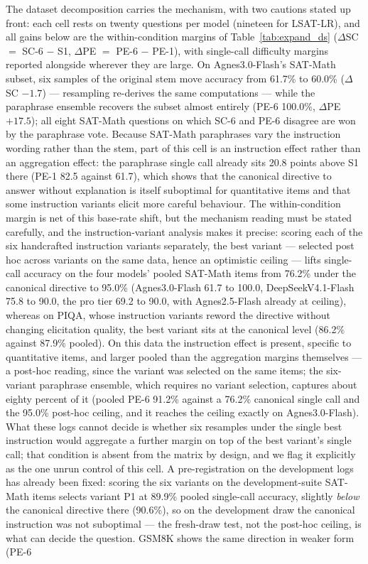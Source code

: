 The dataset decomposition carries the mechanism, with two cautions stated up front: each cell rests on twenty questions per model (nineteen for LSAT-LR), and all gains below are the within-condition margins of Table~\ref{tab:expand_ds} ($\Delta$SC $=$ SC-6 $-$ S1, $\Delta$PE $=$ PE-6 $-$ PE-1), with single-call difficulty margins reported alongside wherever they are large. On Agnes3.0-Flash's SAT-Math subset, six samples of the original stem move accuracy from 61.7\% to 60.0\% ($\Delta$SC $-1.7$) --- resampling re-derives the same computations --- while the paraphrase ensemble recovers the subset almost entirely (PE-6 100.0\%, $\Delta$PE $+17.5$); all eight SAT-Math questions on which SC-6 and PE-6 disagree are won by the paraphrase vote. Because SAT-Math paraphrases vary the instruction wording rather than the stem, part of this cell is an instruction effect rather than an aggregation effect: the paraphrase single call already sits 20.8 points above S1 there (PE-1 82.5 against 61.7), which shows that the canonical directive to answer without explanation is itself suboptimal for quantitative items and that some instruction variants elicit more careful behaviour. The within-condition margin is net of this base-rate shift, but the mechanism reading must be stated carefully, and the instruction-variant analysis makes it precise: scoring each of the six handcrafted instruction variants separately, the best variant --- selected post hoc across variants on the same data, hence an optimistic ceiling --- lifts single-call accuracy on the four models' pooled SAT-Math items from 76.2\% under the canonical directive to 95.0\% (Agnes3.0-Flash 61.7 to 100.0, DeepSeekV4.1-Flash 75.8 to 90.0, the pro tier 69.2 to 90.0, with Agnes2.5-Flash already at ceiling), whereas on PIQA, whose instruction variants reword the directive without changing elicitation quality, the best variant sits at the canonical level (86.2\% against 87.9\% pooled). On this data the instruction effect is present, specific to quantitative items, and larger pooled than the aggregation margins themselves --- a post-hoc reading, since the variant was selected on the same items; the six-variant paraphrase ensemble, which requires no variant selection, captures about eighty percent of it (pooled PE-6 91.2\% against a 76.2\% canonical single call and the 95.0\% post-hoc ceiling, and it reaches the ceiling exactly on Agnes3.0-Flash). What these logs cannot decide is whether six resamples under the single best instruction would aggregate a further margin on top of the best variant's single call; that condition is absent from the matrix by design, and we flag it explicitly as the one unrun control of this cell. A pre-registration on the development logs has already been fixed: scoring the six variants on the development-suite SAT-Math items selects variant P1 at 89.9\% pooled single-call accuracy, slightly \emph{below} the canonical directive there (90.6\%), so on the development draw the canonical instruction was not suboptimal --- the fresh-draw test, not the post-hoc ceiling, is what can decide the question. GSM8K shows the same direction in weaker form (PE-6 